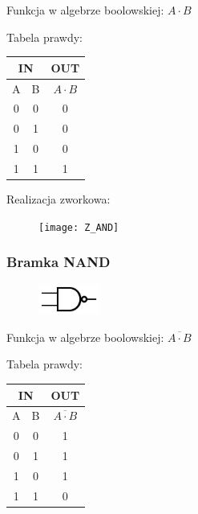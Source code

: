 \documentclass[a4paper,12pt]{article}
\begin{document}
\begin{justify}
Funkcja w algebrze boolowskiej: $A \cdot B$

Tabela prawdy:

\begin{table}[h!]
\begin{center}
\begin{scriptsize}
\begin{tabular}{|c|c|c|}
\hline
\multicolumn{2}{|c}{IN} & OUT  \\
\hline
A & B & $A \cdot B$ \\
\hline
0 & 0 & 0 \\
0 & 1 & 0 \\
1 & 0 & 0 \\
1 & 1 & 1 \\
\hline
\end{tabular}
\end{scriptsize}
\end{center}
\end{table}

Realizacja zworkowa:

\begin{figure}[h!]
\centering
\texttt{[image: Z\_AND]}
\end{figure}

\newpage

\subsubsection{Bramka NAND}

\begin{figure}[h!]
\centering
\includegraphics[width=2cm, height=1cm]{NAND}
\end{figure}

Funkcja w algebrze boolowskiej: $\overline{A \cdot B}$

Tabela prawdy:

\begin{table}[h!]
\begin{center}
\begin{scriptsize}
\begin{tabular}{|c|c|c|}
\hline
\multicolumn{2}{|c}{IN} & OUT  \\
\hline
A & B & $\overline{A \cdot B}$ \\
\hline
0 & 0 & 1 \\
0 & 1 & 1 \\
1 & 0 & 1 \\
1 & 1 & 0 \\
\hline
\end{tabular}
\end{scriptsize}
\end{center}
\end{table}


\end{justify}
\end{document}
